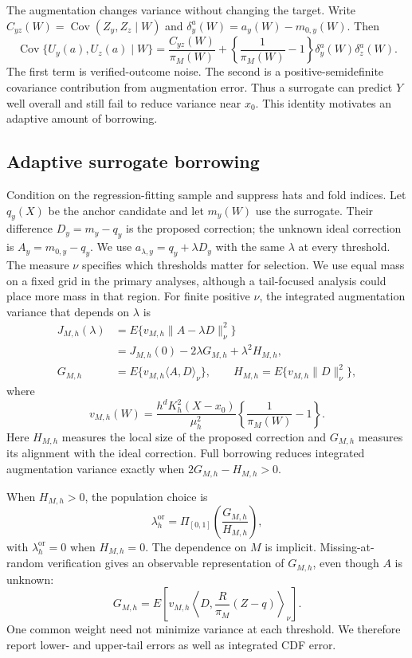 The augmentation changes variance without changing the target. Write
\(C_{yz}(W)=\operatorname{Cov}(Z_y,Z_z\mid W)\) and
\(\delta_y^a(W)=a_y(W)-m_{0,y}(W)\). Then
\[
\operatorname{Cov}\{U_y(a),U_z(a)\mid W\}
=
\frac{C_{yz}(W)}{\pi_M(W)}
+
\left\{\frac1{\pi_M(W)}-1\right\}
\delta_y^a(W)\delta_z^a(W).
\]
The first term is verified-outcome noise. The second is a positive-semidefinite
covariance contribution from augmentation error. Thus a surrogate can predict
\(Y\) well overall and still fail to reduce variance near \(x_0\). This identity
motivates an adaptive amount of borrowing.

\subsection{Adaptive surrogate borrowing}

Condition on the regression-fitting sample and suppress hats and fold indices.
Let \(q_y(X)\) be the anchor candidate and let \(m_y(W)\) use the surrogate. Their
difference \(D_y=m_y-q_y\) is the proposed correction; the unknown ideal
correction is \(A_y=m_{0,y}-q_y\). We use
\(a_{\lambda,y}=q_y+\lambda D_y\) with the same \(\lambda\) at every threshold.
The measure \(\nu\) specifies which thresholds matter for selection. We use
equal mass on a fixed grid in the primary analyses, although a tail-focused
analysis could place more mass in that region. For finite positive \(\nu\), the
integrated augmentation variance that depends on \(\lambda\) is
\[
\begin{aligned}
J_{M,h}(\lambda)
&=
E\{v_{M,h}\|A-\lambda D\|_\nu^2\}\\
&=
J_{M,h}(0)-2\lambda G_{M,h}+\lambda^2H_{M,h},\\
G_{M,h}
&=E\{v_{M,h}\langle A,D\rangle_\nu\},
\qquad
H_{M,h}=E\{v_{M,h}\|D\|_\nu^2\},
\end{aligned}
\]
where
\[
v_{M,h}(W)
=
\frac{h^dK_h^2(X-x_0)}{\mu_h^2}
\left\{\frac1{\pi_M(W)}-1\right\}.
\]
Here \(H_{M,h}\) measures the local size of the proposed correction and
\(G_{M,h}\) measures its alignment with the ideal correction. Full borrowing
reduces integrated augmentation variance exactly when
\(2G_{M,h}-H_{M,h}>0\).

When \(H_{M,h}>0\), the population choice is
\begin{equation}
\lambda_h^{\mathrm{or}}
=
\Pi_{[0,1]}
\left(
\frac{G_{M,h}}{H_{M,h}}
\right),
\label{eq:oracle-lambda}
\end{equation}
with \(\lambda_h^{\mathrm{or}}=0\) when \(H_{M,h}=0\). The dependence on \(M\)
is implicit. Missing-at-random verification gives an observable representation
of \(G_{M,h}\), even though \(A\) is unknown:
\[
G_{M,h}
=
E\left[
v_{M,h}
\left\langle
D,\frac{R}{\pi_M}(Z-q)
\right\rangle_\nu
\right].
\]
One common weight need not minimize variance at each threshold. We therefore
report lower- and upper-tail errors as well as integrated CDF error.

